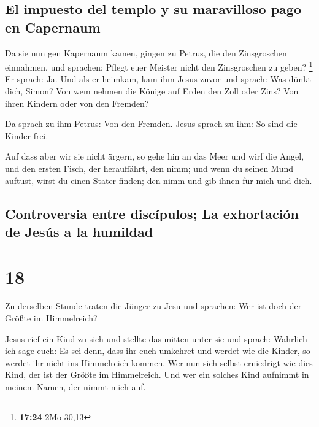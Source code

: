 \hypertarget{el-impuesto-del-templo-y-su-maravilloso-pago-en-capernaum}{%
\subsection{El impuesto del templo y su maravilloso pago en
Capernaum}\label{el-impuesto-del-templo-y-su-maravilloso-pago-en-capernaum}}

 Da sie nun gen Kapernaum kamen, gingen zu Petrus, die
den Zinsgroschen einnahmen, und sprachen: Pflegt euer Meister nicht den
Zinsgroschen zu geben? \footnote{\textbf{17:24} 2Mo 30,13}
 Er sprach: Ja. Und als er heimkam, kam ihm Jesus zuvor
und sprach: Was dünkt dich, Simon? Von wem nehmen die Könige auf Erden
den Zoll oder Zins? Von ihren Kindern oder von den Fremden?

 Da sprach zu ihm Petrus: Von den Fremden. Jesus sprach
zu ihm: So sind die Kinder frei.

 Auf dass aber wir sie nicht ärgern, so gehe hin an das
Meer und wirf die Angel, und den ersten Fisch, der herauffährt, den
nimm; und wenn du seinen Mund auftust, wirst du einen Stater finden; den
nimm und gib ihnen für mich und dich.

\hypertarget{controversia-entre-discuxedpulos-la-exhortaciuxf3n-de-jesuxfas-a-la-humildad}{%
\subsection{Controversia entre discípulos; La exhortación de Jesús a la
humildad}\label{controversia-entre-discuxedpulos-la-exhortaciuxf3n-de-jesuxfas-a-la-humildad}}

\hypertarget{section-17}{%
\section{18}\label{section-17}}

 Zu derselben Stunde traten die Jünger zu Jesu und
sprachen: Wer ist doch der Größte im Himmelreich?

 Jesus rief ein Kind zu sich und stellte das mitten unter
sie  und sprach: Wahrlich ich sage euch: Es sei denn, dass
ihr euch umkehret und werdet wie die Kinder, so werdet ihr nicht ins
Himmelreich kommen.  Wer nun sich selbst erniedrigt wie
dies Kind, der ist der Größte im Himmelreich.  Und wer ein
solches Kind aufnimmt in meinem Namen, der nimmt mich auf.

